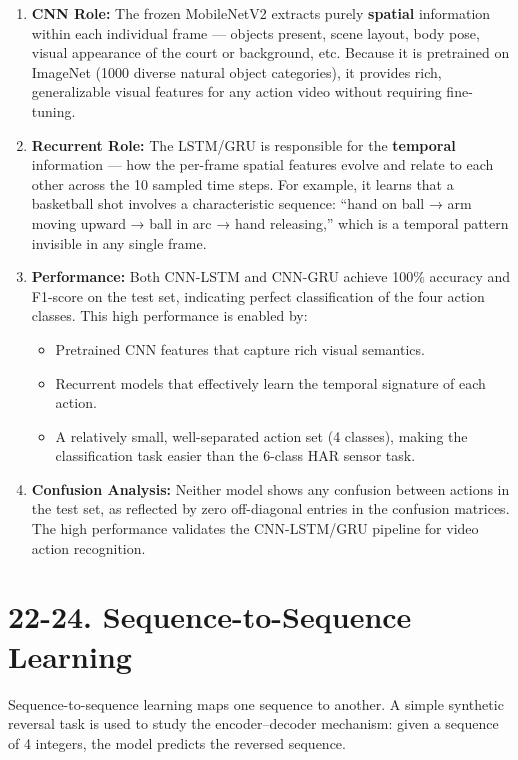 \documentclass[10pt]{article}
\begin{document}
\begin{enumerate}
\item \textbf{CNN Role:} The frozen MobileNetV2 extracts purely \textbf{spatial} information within each 
individual frame — objects present, scene layout, body pose, visual appearance of the court or background, 
etc. Because it is pretrained on ImageNet (1000 diverse natural object categories), it provides rich, 
generalizable visual features for any action video without requiring fine-tuning.

\item \textbf{Recurrent Role:} The LSTM/GRU is responsible for the \textbf{temporal} information — how 
the per-frame spatial features evolve and relate to each other across the 10 sampled time steps. For example, 
it learns that a basketball shot involves a characteristic sequence: ``hand on ball → arm moving upward → ball in arc → hand releasing,'' which is a temporal pattern invisible in any single frame.

\item \textbf{Performance:} Both CNN-LSTM and CNN-GRU achieve 100\% accuracy and F1-score on the test set, 
indicating perfect classification of the four action classes. This high performance is enabled by:
  \begin{itemize}
  \item Pretrained CNN features that capture rich visual semantics.
  \item Recurrent models that effectively learn the temporal signature of each action.
  \item A relatively small, well-separated action set (4 classes), making the classification task easier than the 6-class HAR sensor task.
  \end{itemize}

\item \textbf{Confusion Analysis:} Neither model shows any confusion between actions in the test set, 
as reflected by zero off-diagonal entries in the confusion matrices. The high performance validates 
the CNN-LSTM/GRU pipeline for video action recognition.
\end{enumerate}

\section*{22-24. Sequence-to-Sequence Learning}

Sequence-to-sequence learning maps one sequence to another. A simple synthetic reversal task is used 
to study the encoder--decoder mechanism: given a sequence of 4 integers, the model predicts the reversed 
sequence.
\end{document}
